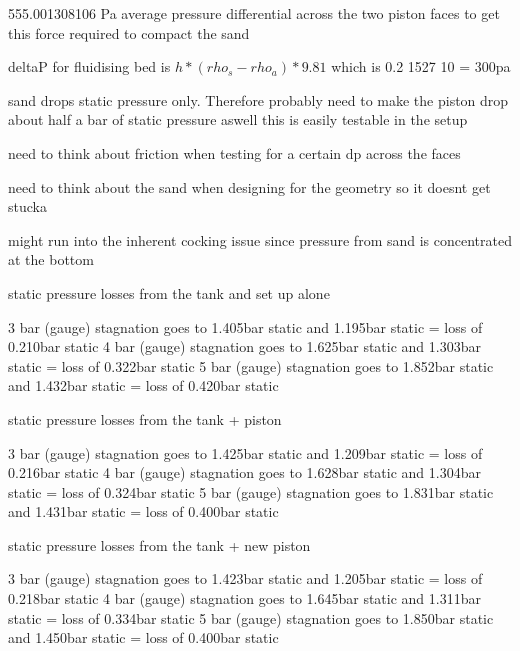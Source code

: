 555.001308106 Pa average pressure differential across the two piston faces to get this force required to compact the sand

deltaP for fluidising bed is $h*(rho_s - rho_a)*9.81$ which is 0.2 1527 10 = 300pa


sand drops static pressure only. Therefore probably need to make the piston drop about half a bar of static pressure aswell
this is easily testable in the setup

need to think about friction when testing for a certain dp across the faces

need to think about the sand when designing for the geometry so it doesnt get stucka

might run into the inherent cocking issue since pressure from sand is concentrated at the bottom

static pressure losses from the tank and set up alone

3 bar (gauge) stagnation goes to 1.405bar static and 1.195bar static = loss of 0.210bar static
4 bar (gauge) stagnation goes to 1.625bar static and 1.303bar static = loss of 0.322bar static
5 bar (gauge) stagnation goes to 1.852bar static and 1.432bar static = loss of 0.420bar static

static pressure losses from the tank + piston

3 bar (gauge) stagnation goes to 1.425bar static and 1.209bar static = loss of 0.216bar static
4 bar (gauge) stagnation goes to 1.628bar static and 1.304bar static = loss of 0.324bar static
5 bar (gauge) stagnation goes to 1.831bar static and 1.431bar static = loss of 0.400bar static

static pressure losses from the tank + new piston

3 bar (gauge) stagnation goes to 1.423bar static and 1.205bar static = loss of 0.218bar static
4 bar (gauge) stagnation goes to 1.645bar static and 1.311bar static = loss of 0.334bar static
5 bar (gauge) stagnation goes to 1.850bar static and 1.450bar static = loss of 0.400bar static
